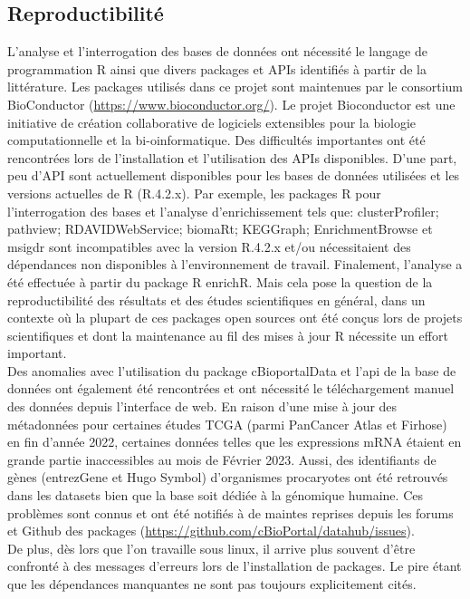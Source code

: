 \documentclass{style}
\begin{document}
\subsection{Reproductibilité}
L’analyse et l'interrogation des bases de données ont nécessité le langage de programmation R ainsi que divers packages et APIs identifiés à partir de la littérature. Les packages utilisés dans ce projet sont maintenues par le consortium BioConductor (\hyperlink{https://www.bioconductor.org/}{https://www.bioconductor.org/}). Le projet Bioconductor est une initiative de création collaborative de logiciels extensibles pour la biologie computationnelle et la bi-oinformatique. Des difficultés importantes ont été rencontrées lors de l’installation et l’utilisation des APIs disponibles. D’une part, peu d’API sont actuellement disponibles pour les bases de données utilisées et les versions actuelles de R (R.4.2.x). Par exemple, les packages R pour l'interrogation des bases et l’analyse d’enrichissement tels que: clusterProfiler; pathview; RDAVIDWebService; biomaRt; KEGGraph; EnrichmentBrowse et msigdr sont incompatibles avec la version R.4.2.x et/ou nécessitaient des dépendances non disponibles à l’environnement de travail. Finalement, l'analyse a été effectuée à partir du package R enrichR. Mais cela pose la question de la reproductibilité des résultats et des études scientifiques en général, dans un contexte où la plupart de ces packages open sources ont été conçus lors de projets scientifiques et dont la maintenance au fil des mises à jour R nécessite un effort important. \\ 
Des anomalies avec l’utilisation du package cBioportalData et l’\acrshort{api} de la base de données ont également été rencontrées et ont nécessité le téléchargement manuel des données depuis l’interface de web. En raison d’une mise à jour des métadonnées pour certaines études TCGA (parmi PanCancer Atlas et Firhose) en fin d’année 2022, certaines données telles que les expressions mRNA étaient en grande partie inaccessibles au mois de Février 2023. Aussi, des identifiants de gènes (entrezGene et Hugo Symbol) d’organismes procaryotes ont été retrouvés dans les datasets bien que la base soit dédiée à la génomique humaine. Ces problèmes sont connus et ont été notifiés à de maintes reprises depuis les forums et Github des packages (\hyperlink{https://github.com/cBioPortal/datahub/issues}{https://github.com/cBioPortal/datahub/issues}). \\
De plus, dès lors que l’on travaille sous linux, il arrive plus souvent d’être confronté à des messages d’erreurs lors de l’installation de packages. Le pire étant que les dépendances manquantes ne sont pas toujours explicitement cités. \\
\end{document}
